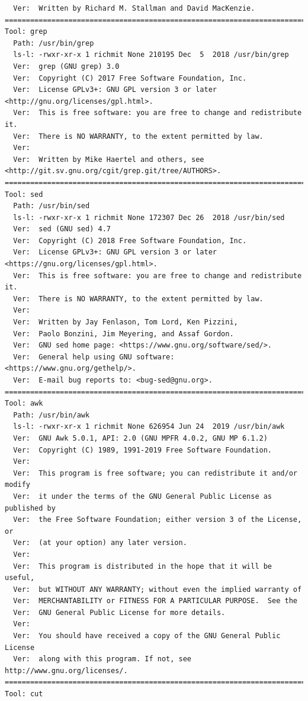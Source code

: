 \documentclass[11pt]{article}
\begin{document}
\begin{verbatim}
  Ver:  Written by Richard M. Stallman and David MacKenzie.
==========================================================================================
Tool: grep
  Path: /usr/bin/grep
  ls-l: -rwxr-xr-x 1 richmit None 210195 Dec  5  2018 /usr/bin/grep
  Ver:  grep (GNU grep) 3.0
  Ver:  Copyright (C) 2017 Free Software Foundation, Inc.
  Ver:  License GPLv3+: GNU GPL version 3 or later <http://gnu.org/licenses/gpl.html>.
  Ver:  This is free software: you are free to change and redistribute it.
  Ver:  There is NO WARRANTY, to the extent permitted by law.
  Ver:  
  Ver:  Written by Mike Haertel and others, see <http://git.sv.gnu.org/cgit/grep.git/tree/AUTHORS>.
==========================================================================================
Tool: sed
  Path: /usr/bin/sed
  ls-l: -rwxr-xr-x 1 richmit None 172307 Dec 26  2018 /usr/bin/sed
  Ver:  sed (GNU sed) 4.7
  Ver:  Copyright (C) 2018 Free Software Foundation, Inc.
  Ver:  License GPLv3+: GNU GPL version 3 or later <https://gnu.org/licenses/gpl.html>.
  Ver:  This is free software: you are free to change and redistribute it.
  Ver:  There is NO WARRANTY, to the extent permitted by law.
  Ver:  
  Ver:  Written by Jay Fenlason, Tom Lord, Ken Pizzini,
  Ver:  Paolo Bonzini, Jim Meyering, and Assaf Gordon.
  Ver:  GNU sed home page: <https://www.gnu.org/software/sed/>.
  Ver:  General help using GNU software: <https://www.gnu.org/gethelp/>.
  Ver:  E-mail bug reports to: <bug-sed@gnu.org>.
==========================================================================================
Tool: awk
  Path: /usr/bin/awk
  ls-l: -rwxr-xr-x 1 richmit None 626954 Jun 24  2019 /usr/bin/awk
  Ver:  GNU Awk 5.0.1, API: 2.0 (GNU MPFR 4.0.2, GNU MP 6.1.2)
  Ver:  Copyright (C) 1989, 1991-2019 Free Software Foundation.
  Ver:  
  Ver:  This program is free software; you can redistribute it and/or modify
  Ver:  it under the terms of the GNU General Public License as published by
  Ver:  the Free Software Foundation; either version 3 of the License, or
  Ver:  (at your option) any later version.
  Ver:  
  Ver:  This program is distributed in the hope that it will be useful,
  Ver:  but WITHOUT ANY WARRANTY; without even the implied warranty of
  Ver:  MERCHANTABILITY or FITNESS FOR A PARTICULAR PURPOSE.  See the
  Ver:  GNU General Public License for more details.
  Ver:  
  Ver:  You should have received a copy of the GNU General Public License
  Ver:  along with this program. If not, see http://www.gnu.org/licenses/.
==========================================================================================
Tool: cut

\end{verbatim}
\end{document}
